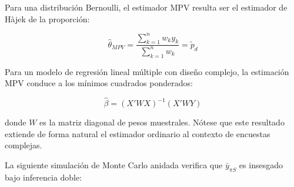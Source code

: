 \documentclass[
  spanish,
  12pt,
]{book}
\begin{document}
Para una distribución Bernoulli, el estimador MPV resulta ser el estimador de Hàjek de la proporción:

\[
\hat{\theta}_{MPV} = \frac{\sum_{k=1}^{n} w_k y_k}{\sum_{k=1}^{n} w_k} = \tilde{p}_d
\]

Para un modelo de regresión lineal múltiple con diseño complejo, la estimación MPV conduce a los mínimos cuadrados ponderados:

\[
\hat{\beta} = (X'WX)^{-1}(X'WY)
\]

donde \(W\) es la matriz diagonal de pesos muestrales. Nótese que este resultado extiende de forma natural el estimador ordinario al contexto de encuestas complejas.

La siguiente simulación de Monte Carlo anidada verifica que \(\bar{y}_{\pi S}\) es insesgado bajo inferencia doble:
\end{document}
